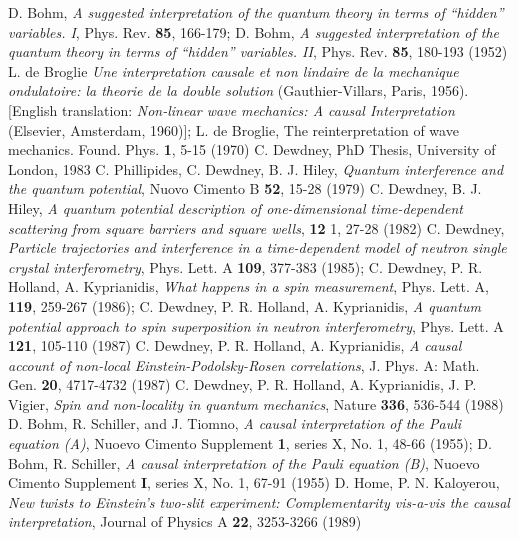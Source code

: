 \begin{thebibliography}{99}
 D. Bohm,  {\it A suggested interpretation of the quantum theory in terms of ``hidden'' variables. I},  Phys. Rev. {\bf 85}, 166-179; D. Bohm, {\it A suggested interpretation of the quantum theory in terms of ``hidden'' variables. II}, Phys. Rev.  {\bf 85}, 180-193 (1952)
 L. de Broglie \textit{Une interpretation causale et non lindaire de la mechanique ondulatoire: la theorie de la double solution} (Gauthier-Villars, Paris, 1956). [English translation: \textit{ Non-linear wave mechanics: A causal Interpretation} (Elsevier, Amsterdam, 1960)]; L. de Broglie, The reinterpretation of wave mechanics. Found. Phys. {\bf 1}, 5-15 (1970)
  C. Dewdney, PhD Thesis, University of London, 1983
  C. Phillipides, C. Dewdney, B. J. Hiley, {\it Quantum interference and the quantum potential}, Nuovo Cimento B {\bf 52}, 15-28 (1979)
 C. Dewdney,  B. J. Hiley, {\it A quantum potential description of one-dimensional time-dependent scattering from square barriers and square wells}, {\bf 12} 1, 27-28 (1982)
 C. Dewdney,  {\it Particle trajectories and interference in a time-dependent model of neutron single crystal interferometry}, Phys. Lett. A {\bf 109}, 377-383 (1985);
 C. Dewdney, P. R. Holland, A. Kyprianidis, {\it What happens in a spin measurement}, Phys. Lett. A, {\bf 119}, 259-267 (1986); 
 C. Dewdney, P. R. Holland, A. Kyprianidis, {\it A quantum potential approach to spin superposition in neutron interferometry}, Phys. Lett. A {\bf 121}, 105-110 (1987)
 C. Dewdney, P. R. Holland,  A. Kyprianidis, {\it A causal account of non-local Einstein-Podolsky-Rosen correlations}, J. Phys. A: Math. Gen. {\bf 20}, 4717-4732 (1987)
 C. Dewdney, P. R. Holland, A. Kyprianidis, J. P. Vigier, {\it Spin and  non-locality in quantum mechanics}, Nature {\bf 336}, 536-544 (1988)
 D. Bohm, R. Schiller,  and J. Tiomno, {\it A causal interpretation of the Pauli equation (A)}, Nuoevo Cimento Supplement {\bf 1}, series X, No. 1, 48-66 (1955); D. Bohm, R. Schiller, {\it A causal interpretation of the Pauli equation (B)}, Nuoevo Cimento Supplement {\bf I}, series X, No. 1, 67-91 (1955)
 D. Home, P. N. Kaloyerou, {\it New twists to Einstein's two-slit experiment: Complementarity vis-a-vis the causal interpretation}, Journal of Physics A {\bf 22}, 3253-3266 (1989)

\end{thebibliography}
